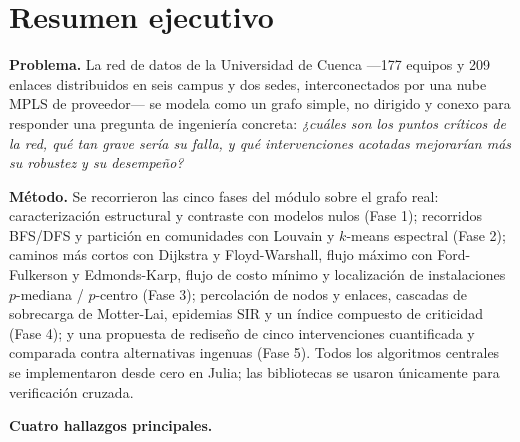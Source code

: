 \documentclass[10pt,a4paper]{extarticle}
\begin{document}
\tableofcontents
\newpage
{}
\setcounter{page}{1}

\section*{Resumen ejecutivo}
\markboth{}{}

\textbf{Problema.} La red de datos de la Universidad de Cuenca ---177 equipos y 209
enlaces distribuidos en seis campus y dos sedes, interconectados por una nube MPLS de
proveedor--- se modela como un grafo simple, no dirigido y conexo para responder una
pregunta de ingeniería concreta: \textit{¿cuáles son los puntos críticos de la red, qué
tan grave sería su falla, y qué intervenciones acotadas mejorarían más su robustez y su
desempeño?}

\textbf{Método.} Se recorrieron las cinco fases del módulo sobre el grafo real:
caracterización estructural y contraste con modelos nulos (Fase 1); recorridos BFS/DFS y
partición en comunidades con Louvain y $k$-means espectral (Fase 2); caminos más cortos
con Dijkstra y Floyd-Warshall, flujo máximo con Ford-Fulkerson y Edmonds-Karp, flujo de
costo mínimo y localización de instalaciones $p$-mediana / $p$-centro (Fase 3);
percolación de nodos y enlaces, cascadas de sobrecarga de Motter-Lai, epidemias SIR y un
índice compuesto de criticidad (Fase 4); y una propuesta de rediseño de cinco
intervenciones cuantificada y comparada contra alternativas ingenuas (Fase 5). Todos los
algoritmos centrales se implementaron desde cero en Julia; las bibliotecas se usaron
únicamente para verificación cruzada.

\textbf{Cuatro hallazgos principales.}
\end{document}

